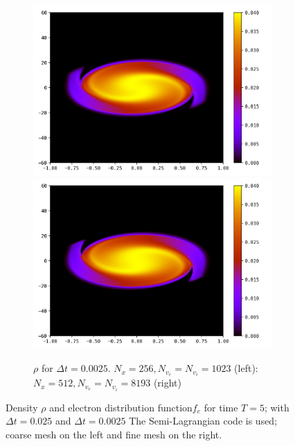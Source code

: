 \documentclass{article}
\numberwithin{equation}{section}
\newcommand{\mysubcaption}[1]{
	\vspace*{5pt}
	\begin{minipage}{0.8\linewidth}
		\begin{center}
			\footnotesize\emph{#1}
		\end{center}
	\end{minipage}
}
\newcommand{\imh}{\textheight} %
\begin{document}
\begin{figure}
	\begin{subfigure}{\textwidth}
		\centering
		\includegraphics[height=\imh,width=0.45\linewidth]{images/feT5_run5n.png}
		\includegraphics[height=\imh,width=0.45\linewidth]{images/feT5_run5z.png}
		\caption{$\rho$ for $\Delta t=0.0025$. $N_x=256, N_{v_e}=N_{v_i}=1023$ (left): $N_x=512  , N_{v_e}=N_{v_i} = 8193$ (right)}
	\end{subfigure}



	\caption{Density $\rho$ and electron distribution function$f_e$ for time $T=5$; with $\Delta t=0.025$ and $\Delta t = 0.0025$
	 The Semi-Lagrangian code is used; coarse mesh on the left and fine mesh on the right.
	}
	\label{fig:comp_temps2}
\end{figure}  





\end{document}

